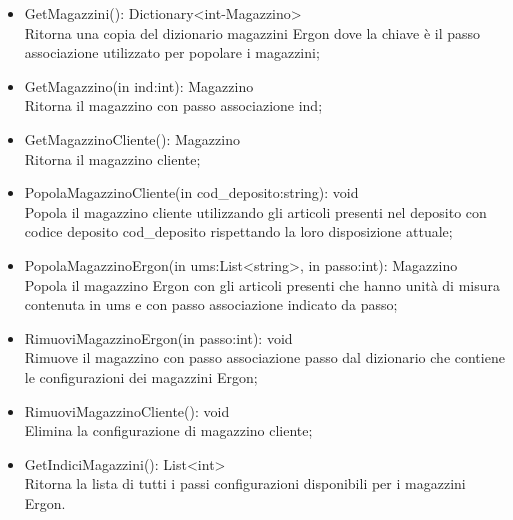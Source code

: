 \begin{itemize}
    \item GetMagazzini(): Dictionary<int-Magazzino>\\
    Ritorna una copia del dizionario magazzini Ergon dove la chiave è il passo associazione utilizzato per popolare i magazzini;
    \item GetMagazzino(in ind:int): Magazzino \\
    Ritorna il magazzino con passo associazione ind;
    \item GetMagazzinoCliente(): Magazzino \\
    Ritorna il magazzino cliente;
    \item PopolaMagazzinoCliente(in cod_deposito:string): void \\
    Popola il magazzino cliente utilizzando gli articoli presenti nel deposito con codice deposito cod_deposito rispettando la loro disposizione attuale;
    \item PopolaMagazzinoErgon(in ums:List<string>, in passo:int): Magazzino \\
    Popola il magazzino Ergon con gli articoli presenti che hanno unità di misura contenuta in ums e con passo associazione indicato da passo;
    \item RimuoviMagazzinoErgon(in passo:int): void \\
    Rimuove il magazzino con passo associazione passo dal dizionario che contiene le configurazioni dei magazzini Ergon;
    \item RimuoviMagazzinoCliente(): void \\
    Elimina la configurazione di magazzino cliente;
    \item GetIndiciMagazzini(): List<int> \\
    Ritorna la lista di tutti i passi configurazioni disponibili per i magazzini Ergon.
\end{itemize} 









